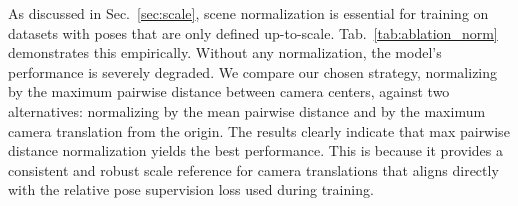 As discussed in Sec.~\ref{sec:scale}, scene normalization is essential for training on datasets with poses that are only defined up-to-scale. Tab.~\ref{tab:ablation_norm} demonstrates this empirically. Without any normalization, the model's performance is severely degraded. We compare our chosen strategy, normalizing by the maximum pairwise distance between camera centers, against two alternatives: normalizing by the mean pairwise distance and by the maximum camera translation from the origin. The results clearly indicate that max pairwise distance normalization yields the best performance. This is because it provides a consistent and robust scale reference for camera translations that aligns directly with the relative pose supervision loss used during training.
